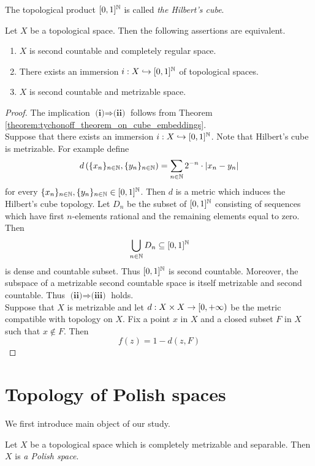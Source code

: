 \begin{definition}
The topological product $[0,1]^{{\mathbb N}}$ is called \textit{the Hilbert's cube}. 
\end{definition}

\begin{corollary}\label{corollary:tychonoff_metrization_theorem}
Let $X$ be a topological space. Then the following assertions are equivalent.
\begin{enumerate}[label=\emph{\textbf{(\roman*)}}, leftmargin=*]
\item $X$ is second countable and completely regular space.
\item There exists an immersion $i:X\hookrightarrow [0,1]^{{\mathbb N}}$ of topological spaces.
\item $X$ is second countable and metrizable space.
\end{enumerate}
\end{corollary}
\begin{proof}
The implication $\textbf{(i)}\Rightarrow \textbf{(ii)}$ follows from Theorem \ref{theorem:tychonoff_theorem_on_cube_embeddings}.\\
Suppose that there exists an immersion $i:X\hookrightarrow [0,1]^{{\mathbb N}}$. Note that Hilbert's cube is metrizable. For example define
$$d\left(\{x_n\}_{n\in {\mathbb N}},\{y_n\}_{n\in {\mathbb N}}\right) = \sum_{n\in {\mathbb N}}2^{-n}\cdot |x_n - y_n|$$
for every $\{x_n\}_{n\in {\mathbb N}},\{y_n\}_{n\in {\mathbb N}} \in [0,1]^{{\mathbb N}}$. Then $d$ is a metric which induces the Hilbert's cube topology. Let $D_n$ be the subset of $[0,1]^{{\mathbb N}}$ consisting of sequences which have first $n$-elements rational and the remaining elements equal to zero. Then 
$$\bigcup_{n\in {\mathbb N}}D_n\subseteq [0,1]^{{\mathbb N}}$$
is dense and countable subset. Thus $[0,1]^{{\mathbb N}}$ is second countable. Moreover, the subspace of a metrizable second countable space is itself metrizable and second countable. Thus $\textbf{(ii)}\Rightarrow \textbf{(iii)}$ holds.\\
Suppose that $X$ is metrizable and let $d:X\times X \rightarrow [0,+\infty)$ be the metric compatible with topology on $X$. Fix a point $x$ in $X$ and a closed subset $F$ in $X$ such that $x\not \in F$. Then
$$f(z) = 1 - d(z,F)$$ 
\end{proof}



\section{Topology of Polish spaces}
We first introduce main object of our study.

\begin{definition}
Let $X$ be a topological space which is completely metrizable and separable. Then $X$ is \textit{a Polish space}.
\end{definition}

















\small



